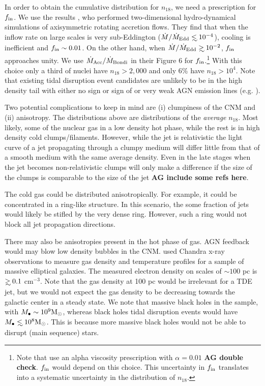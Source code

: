 \documentclass[usenatbib,fleqn]{mnras}
\newcommand\lsim{\mathrel{\rlap{\lower4pt\hbox{\hskip1pt$\sim$}}
    \raise1pt\hbox{$<$}}}
\newcommand\gsim{\mathrel{\rlap{\lower4pt\hbox{\hskip1pt$\sim$}}
    \raise1pt\hbox{$>$}}}
\newcommand{\Mbh}[1][]{M_{\bullet#1}}
\newcommand{\Msun}{{\rm M_\odot}}
\begin{document}
In order to obtain the cumulative distribution for $n_{18}$, we need a
prescription for $f_{\rm in}$. We use the results \citet{Li+2013}, who
performed two-dimensional hydro-dynamical simulations of axisymmetric
rotating accretion flows. They find that when the inflow rate on large
scales is very sub-Eddington ($\dot{M}/\dot{M}_{\rm Edd} \lsim
10^{-4}$), cooling is inefficient and $f_{\rm in}\sim 0.01$. On the
other hand, when $\dot{M}/\dot{M}_{\rm Edd}\gsim 10^{-2}$, $f_{\rm
  in}$ approaches unity.  We use $\dot{M}_{\rm Acc}/\dot{M}_{\rm
  Bondi}$ in their Figure 6 for $f_{\rm in}$.\footnote{Note that
  \citet{Li+2013} use an alpha viscosity prescription with
  $\alpha=0.01$ {\bf AG double check}.  $f_{\rm in}$ would depend on
  this choice. This uncertainty in $f_{\rm in}$ translates into a
  systematic uncertainty in the distribution of $n_{18}$.}  With this
choice only a third of nuclei have $n_{18}>2,000$ and only 6\% have
$n_{18}>10^{4}$. Note that existing tidal disruption event candidates
are unlikely to be in the high density tail with either no sign or
sign of or very weak AGN emission lines
(e.g. \citealt{van-Velzen+2011, Arcavi+2014}).

Two potential complications to keep in mind are (i) clumpiness of the
CNM and (ii) anisotropy. The distributions above are distributions of
the {\it average} $n_{18}$.  Most likely, some of the nuclear gas in a
low density hot phase, while the rest is in high density cold
clumps/filaments.  However, while the jet is relativistic the
light curve of a jet propagating through a clumpy medium will differ
little from that of a smooth medium with the same average
density. Even in the late stages when the jet becomes non-relativistic
clumps will only make a difference if the size of the clumps is
comparable to the size of the jet {\bf AG include some refs here}.

The cold gas could be distributed anisotropically. For example, it
could be concentrated in a ring-like structure. In this scenario, the
some fraction of jets would likely be stifled by the very dense
ring. However, such a ring would not block all jet propagation
directions.

There may also be anisotropies present in the hot phase of gas. AGN
feedback would may blow low density bubbles in the
CNM. \citet{Russell+2013} used Chandra x-ray observations to measure
gas density and temperature profiles for a sample of massive
elliptical galaxies. The measured electron density on scales of $\sim
100$ pc is $\gsim 0.1$ cm$^{-3}$. Note that the gas density at 100 pc
would be irrelevant for a TDE jet, but we would not expect the gas
density to be decreasing towards the galactic center in a steady
state.  We note that massive black holes in the \citet{Russell+2013}
sample, with $\Mbh\sim 10^{9} \Msun$, whereas black holes tidal
disruption events would have $\Mbh\lsim 10^8 \Msun$. This is because
more massive black holes would not be able to disrupt (main sequence)
stars.
\end{document}

